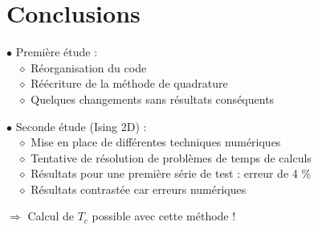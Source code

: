 \documentclass[9pt]{beamer}
\begin{document}
	
	\section{Conclusions}
	
	\sommaire{}
	
		\begin{frame}
	\justifying
	\vspace*{22pt}
	
	$\bullet$ Première étude : \\
	\vspace*{5pt}
		$\quad \diamond$ Réorganisation du code \\
		$\quad \diamond$ Réécriture de la méthode de quadrature \\
		$\quad \diamond$ Quelques changements sans résultats conséquents\\
	
	\vspace*{15pt}
	
	$\bullet$ Seconde étude (Ising 2D) : \\
		\vspace*{5pt}
	$\quad \diamond$ Mise en place de différentes techniques numériques\\
	$\quad \diamond$ Tentative de résolution de problèmes de temps de calculs\\
	$\quad \diamond$ Résultats pour une première série de test : erreur de 4 \%\\
	$\quad \diamond$ Résultats contrastée car erreurs numériques \\
	
		\vspace*{15pt}
	
	
	$\Rightarrow$ Calcul de $T_c$ possible avec cette méthode !
	
	\end{frame}
	
	
\end{document}
